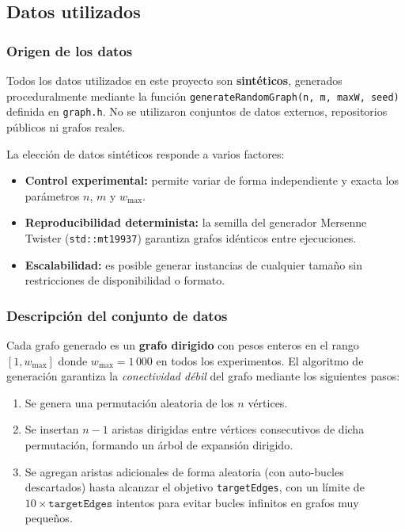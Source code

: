 
\subsection{Datos utilizados}

\subsubsection{Origen de los datos}

Todos los datos utilizados en este proyecto son \textbf{sintéticos}, generados
proceduralmente mediante la función \texttt{generateRandomGraph(n, m, maxW,
seed)} definida en \texttt{graph.h}. No se utilizaron conjuntos de datos
externos, repositorios públicos ni grafos reales.

La elección de datos sintéticos responde a varios factores:

\begin{itemize}
  \item \textbf{Control experimental:} permite variar de forma independiente
    y exacta los parámetros $n$, $m$ y $w_{\max}$.
  \item \textbf{Reproducibilidad determinista:} la semilla del generador
    Mersenne Twister (\texttt{std::mt19937}) garantiza grafos idénticos entre
    ejecuciones.
  \item \textbf{Escalabilidad:} es posible generar instancias de cualquier
    tamaño sin restricciones de disponibilidad o formato.
\end{itemize}

\subsubsection{Descripción del conjunto de datos}

Cada grafo generado es un \textbf{grafo dirigido} con pesos enteros en el
rango $[1, w_{\max}]$ donde $w_{\max} = 1\,000$ en todos los experimentos.
El algoritmo de generación garantiza la \textit{conectividad débil} del grafo
mediante los siguientes pasos:

\begin{enumerate}
  \item Se genera una permutación aleatoria de los $n$ vértices.
  \item Se insertan $n-1$ aristas dirigidas entre vértices consecutivos de
    dicha permutación, formando un árbol de expansión dirigido.
  \item Se agregan aristas adicionales de forma aleatoria (con auto-bucles
    descartados) hasta alcanzar el objetivo \texttt{targetEdges}, con un
    límite de $10 \times \texttt{targetEdges}$ intentos para evitar bucles
    infinitos en grafos muy pequeños.
\end{enumerate}

